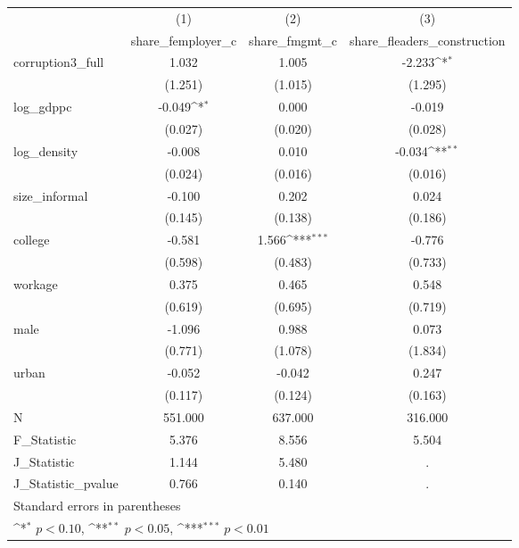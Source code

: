 {
\def\sym#1{\ifmmode^{#1}\else\(^{#1}\)\fi}
\begin{tabular}{l*{3}{c}}
\hline\hline
            &\multicolumn{1}{c}{(1)}&\multicolumn{1}{c}{(2)}&\multicolumn{1}{c}{(3)}\\
            &\multicolumn{1}{c}{share\_femployer\_c}&\multicolumn{1}{c}{share\_fmgmt\_c}&\multicolumn{1}{c}{share\_fleaders\_construction}\\
\hline
corruption3\_full&       1.032         &       1.005         &      -2.233\sym{*}  \\
            &     (1.251)         &     (1.015)         &     (1.295)         \\
[1em]
log\_gdppc   &      -0.049\sym{*}  &       0.000         &      -0.019         \\
            &     (0.027)         &     (0.020)         &     (0.028)         \\
[1em]
log\_density &      -0.008         &       0.010         &      -0.034\sym{**} \\
            &     (0.024)         &     (0.016)         &     (0.016)         \\
[1em]
size\_informal&      -0.100         &       0.202         &       0.024         \\
            &     (0.145)         &     (0.138)         &     (0.186)         \\
[1em]
college     &      -0.581         &       1.566\sym{***}&      -0.776         \\
            &     (0.598)         &     (0.483)         &     (0.733)         \\
[1em]
workage     &       0.375         &       0.465         &       0.548         \\
            &     (0.619)         &     (0.695)         &     (0.719)         \\
[1em]
male        &      -1.096         &       0.988         &       0.073         \\
            &     (0.771)         &     (1.078)         &     (1.834)         \\
[1em]
urban       &      -0.052         &      -0.042         &       0.247         \\
            &     (0.117)         &     (0.124)         &     (0.163)         \\
\hline
N           &     551.000         &     637.000         &     316.000         \\
F\_Statistic &       5.376         &       8.556         &       5.504         \\
J\_Statistic &       1.144         &       5.480         &           .         \\
J\_Statistic\_pvalue&       0.766         &       0.140         &           .         \\
\hline\hline
\multicolumn{4}{l}{\footnotesize Standard errors in parentheses}\\
\multicolumn{4}{l}{\footnotesize \sym{*} \(p<0.10\), \sym{**} \(p<0.05\), \sym{***} \(p<0.01\)}\\
\end{tabular}
}
